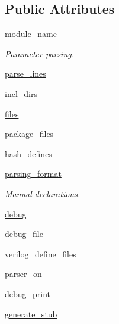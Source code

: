 \subsection*{Public Attributes}
\begin{DoxyCompactItemize}
\item 
\hyperlink{classsrc_1_1verilog__parser_1_1verilog__parser_a517fc26126209e45aa5eefee4e937fd5}{module\-\_\-name}
\begin{DoxyCompactList}\small\item\em Parameter parsing. \end{DoxyCompactList}\item 
\hyperlink{classsrc_1_1verilog__parser_1_1verilog__parser_ae7207d3f921f1717d4c75b105beb3bd9}{parse\-\_\-lines}
\item 
\hyperlink{classsrc_1_1verilog__parser_1_1verilog__parser_a0fac67c4c5969d90e8b49edd665d9677}{incl\-\_\-dirs}
\item 
\hyperlink{classsrc_1_1verilog__parser_1_1verilog__parser_a7f17d4fbfa695ef7dd9a846135434690}{files}
\item 
\hyperlink{classsrc_1_1verilog__parser_1_1verilog__parser_a32cec6a447990615389a8cf249caa57c}{package\-\_\-files}
\item 
\hyperlink{classsrc_1_1verilog__parser_1_1verilog__parser_add046555471f9fe5a92518cf17462e38}{hash\-\_\-defines}
\item 
\hyperlink{classsrc_1_1verilog__parser_1_1verilog__parser_a1f81b9bfb1e1f5bf5819d26689b5a177}{parsing\-\_\-format}
\begin{DoxyCompactList}\small\item\em Manual declarations. \end{DoxyCompactList}\item 
\hyperlink{classsrc_1_1verilog__parser_1_1verilog__parser_a08e67f9ef0de0181a10caacaec6116d5}{debug}
\item 
\hyperlink{classsrc_1_1verilog__parser_1_1verilog__parser_ac8668d7328c5a15f7d67ede379b30ea3}{debug\-\_\-file}
\item 
\hyperlink{classsrc_1_1verilog__parser_1_1verilog__parser_afdfce44cfa00c4603ac52ef06cfbaeed}{verilog\-\_\-define\-\_\-files}
\item 
\hyperlink{classsrc_1_1verilog__parser_1_1verilog__parser_abdf606fe7e29eadd46bbefe59cc4ae2a}{parser\-\_\-on}
\item 
\hyperlink{classsrc_1_1verilog__parser_1_1verilog__parser_a2f62555a692365df5e08fda3b4869c82}{debug\-\_\-print}
\item 
\hyperlink{classsrc_1_1verilog__parser_1_1verilog__parser_aef575793938cd682ab9b35ef0f954d2c}{generate\-\_\-stub}

\end{DoxyCompactItemize}
